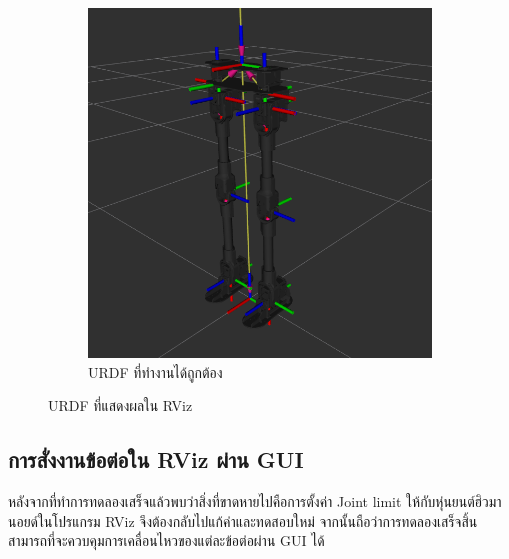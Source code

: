\begin{figure}[!ht]
\begin{subfigure}[b]{0.65\textwidth}
        \includegraphics[width=\textwidth]{chapter4/images/urdf_rviz2.png}
        \caption{URDF ที่ทำงานได้ถูกต้อง}
    \end{subfigure}
    \caption{URDF ที่แสดงผลใน RViz}
\end{figure}

\subsection{การสั่งงานข้อต่อใน RViz ผ่าน GUI}
หลังจากที่ทำการทดลองเสร็จแล้วพบว่าสิ่งที่ขาดหายไปคือการตั้งค่า Joint limit ให้กับหุ่นยนต์ฮิวมานอยด์ในโปรแกรม RViz
จึงต้องกลับไปแก้ค่าและทดสอบใหม่ จากนั้นถือว่าการทดลองเสร็จสิ้น สามารถที่จะควบคุมการเคลื่อนไหวของแต่ละข้อต่อผ่าน GUI ได้

